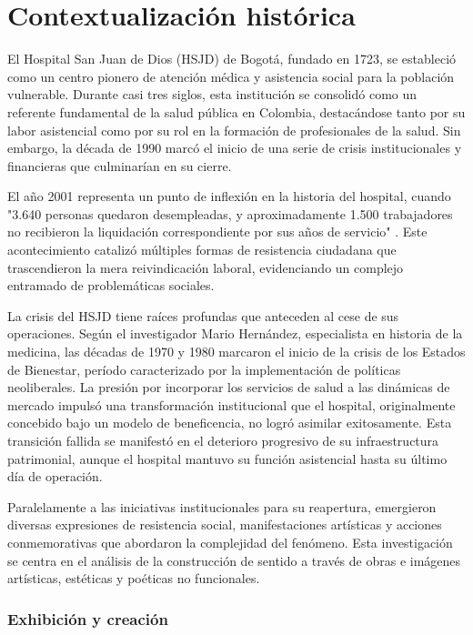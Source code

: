 \section*{Contextualización histórica}

El Hospital San Juan de Dios (HSJD) de Bogotá, fundado en 1723, se estableció como un centro pionero de atención médica y asistencia social para la población vulnerable. Durante casi tres siglos, esta institución se consolidó como un referente fundamental de la salud pública en Colombia, destacándose tanto por su labor asistencial como por su rol en la formación de profesionales de la salud. Sin embargo, la década de 1990 marcó el inicio de una serie de crisis institucionales y financieras que culminarían en su cierre.

El año 2001 representa un punto de inflexión en la historia del hospital, cuando "3.640 personas quedaron desempleadas, y aproximadamente 1.500 trabajadores no recibieron la liquidación correspondiente por sus años de servicio" \parencite{Castiblanco2017}. Este acontecimiento catalizó múltiples formas de resistencia ciudadana que trascendieron la mera reivindicación laboral, evidenciando un complejo entramado de problemáticas sociales.

La crisis del HSJD tiene raíces profundas que anteceden al cese de sus operaciones. Según el investigador Mario Hernández, especialista en historia de la medicina, las décadas de 1970 y 1980 marcaron el inicio de la crisis de los Estados de Bienestar, período caracterizado por la implementación de políticas neoliberales. La presión por incorporar los servicios de salud a las dinámicas de mercado impulsó una transformación institucional que el hospital, originalmente concebido bajo un modelo de beneficencia, no logró asimilar exitosamente. Esta transición fallida se manifestó en el deterioro progresivo de su infraestructura patrimonial, aunque el hospital mantuvo su función asistencial hasta su último día de operación.

Paralelamente a las iniciativas institucionales para su reapertura, emergieron diversas expresiones de resistencia social, manifestaciones artísticas y acciones conmemorativas que abordaron la complejidad del fenómeno. Esta investigación se centra en el análisis de la construcción de sentido a través de obras e imágenes artísticas, estéticas y poéticas no funcionales.

\subsubsection*{Exhibición y creación}

